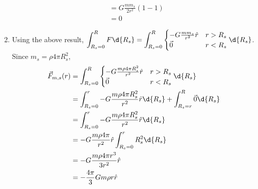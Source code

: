 \documentclass{esg8012pset}
\begin{document}
\begin{solution}
\begin{enumerate}[1)]
\begin{align*}
     & = G \frac{m m_s}{2r^2} \left(1 - 1\right) \\
     & = 0
    \end{align*}
    \item Using the above result, $\displaystyle \int_{R_s=0}^{R} F\d{R_s} = \int_{R_s=0}^{R} \begin{cases} -G\frac{mm_s}{r^2}\hat r & r > R_s \\ \vec 0 & r < R_s\end{cases} \d{R_s}$.  Since $m_s = \rho 4\pi R_s^2$, \begin{align*}
     \vec F_{m,s}(r) & =  \int_{R_s=0}^{R} \begin{cases} -G\frac{m \rho 4\pi R_s^2 }{r^2}\hat r & r > R_s \\ \vec 0 & r < R_s\end{cases} \d{R_s} \\
     & = \int_{R_s=0}^{r} -G\frac{m \rho 4\pi R_s^2 }{r^2}\hat r \d{R_s} + \int_{R_s=r}^{R} \vec 0 \d{R_s} \\
     & = \int_{R_s=0}^{r} -G\frac{m \rho 4\pi R_s^2 }{r^2}\hat r \d{R_s} \\
     & = -G\frac{m \rho 4\pi}{r^2}\hat r \int_{R_s=0}^{r} R_s^2 \d{R_s} \\
     & = -G\frac{m \rho 4\pi r^3}{3 r^2}\hat r \\
     & = -\frac{4\pi}{3}G m \rho r\hat r
    \end{align*}
  \end{enumerate}
\end{solution}
\end{document}
